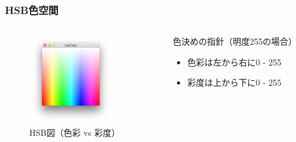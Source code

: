 \documentclass[10pt, dvipdfmx]{beamer}
\begin{document}
        \begin{frame}
            \frametitle{HSB色空間}
            \begin{columns}[c]
                \begin{column}{0.50\textwidth}
                    \begin{figure}[htb]
                        \includegraphics[width=36mm]{images/10.png}
                        \caption{HSB図（色彩 vs 彩度）}
                        \label{fig:10}
                    \end{figure}
                \end{column}
                \begin{column}{0.50\textwidth}
                    \begin{block}{色決めの指針（明度255の場合）}
                        \begin{itemize}
                            \item 色彩は左から右に0 - 255
                            \item 彩度は上から下に0 - 255
                        \end{itemize}
                    \end{block}
                \end{column}
            \end{columns}
        \end{frame}
\end{document}
